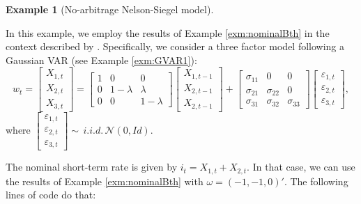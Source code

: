 \documentclass[
  12pt,
]{book}
\theoremstyle{definition}
\theoremstyle{definition}
\newtheorem{example}{Example}[chapter]
\theoremstyle{definition}
\theoremstyle{definition}
\theoremstyle{remark}
\begin{document}
\begin{example}[No-arbitrage Nelson-Siegel model]
\protect\hypertarget{exm:CDR2009}{}\label{exm:CDR2009}

In this example, we employ the results of Example \ref{exm:nominalBth} in the context described by \citet{Christensen_Diebold_Rudebusch_2009}. Specifically, we consider a three factor model following a Gaussian VAR (see Example \ref{exm:GVAR1}):
\[
w_t = \left[\begin{array}{c}X_{1,t}\\X_{2,t}\\X_{3,t}\end{array}\right] = 
\left[\begin{array}{ccc}
1 & 0 & 0\\
0&1-\lambda&\lambda\\
0&0&1-\lambda\end{array}\right]
\left[\begin{array}{c}X_{1,t-1}\\X_{2,t-1}\\X_{2,t-1}\end{array}\right] +
\left[\begin{array}{ccc}
\sigma_{11} & 0 & 0\\
\sigma_{21}&\sigma_{22}&0\\
\sigma_{31}&\sigma_{32}&\sigma_{33}\end{array}\right]
\left[\begin{array}{c}\varepsilon_{1,t}\\\varepsilon_{2,t}\\\varepsilon_{3,t}\end{array}\right],
\]
where \(\left[\begin{array}{c}\varepsilon_{1,t}\\\varepsilon_{2,t}\\\varepsilon_{3,t}\end{array}\right] \sim \,i.i.d.\, \mathcal{N}(0,Id)\).

The nominal short-term rate is given by \(i_t = X_{1,t}+X_{2,t}\). In that case, we can use the results of Example \ref{exm:nominalBth} with \(\omega = (-1,-1,0)'\). The following lines of code do that:


\end{example}
\end{document}
